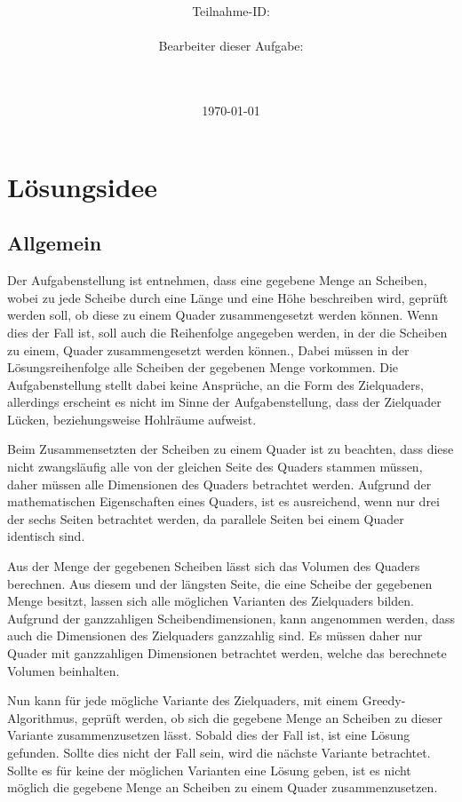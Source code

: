 \documentclass[a4paper,10pt,ngerman]{scrartcl}
\title{\textbf{\Huge\Aufgabe}}
\author{\LARGE Teilnahme-ID: \LARGE \TeilnahmeId \\\\
\LARGE Bearbeiter dieser Aufgabe: \\
\LARGE \Name\\\\}
\date{\LARGE\today}
\begin{document}
    \maketitle
    \tableofcontents
    \vspace{0.5cm}

    \newpage


    \section{Lösungsidee}\label{sec:losungsidee}

    \subsection{Allgemein}\label{subsec:allgemein}

    Der Aufgabenstellung ist entnehmen, dass eine gegebene Menge an Scheiben, wobei zu jede Scheibe durch
    eine Länge und eine Höhe beschreiben wird, geprüft werden soll, ob diese zu einem Quader zusammengesetzt werden können.
    Wenn dies der Fall ist, soll auch die Reihenfolge angegeben werden, in der die Scheiben zu einem, Quader zusammengesetzt werden können.,
    Dabei müssen in der Lösungsreihenfolge alle Scheiben der gegebenen Menge vorkommen.
    Die Aufgabenstellung stellt dabei keine Ansprüche, an die Form des Zielquaders, allerdings erscheint es nicht im Sinne der Aufgabenstellung,
    dass der Zielquader Lücken, beziehungsweise Hohlräume aufweist.

    Beim Zusammensetzten der Scheiben zu einem Quader ist zu beachten, dass diese nicht zwangsläufig alle von der gleichen Seite des Quaders stammen müssen,
    daher müssen alle Dimensionen des Quaders betrachtet werden.
    Aufgrund der mathematischen Eigenschaften eines Quaders, ist es ausreichend, wenn nur drei der sechs Seiten betrachtet werden,
    da parallele Seiten bei einem Quader identisch sind.

    Aus der Menge der gegebenen Scheiben lässt sich das Volumen des Quaders berechnen.
    Aus diesem und der längsten Seite, die eine Scheibe der gegebenen Menge besitzt, lassen sich alle möglichen Varianten des Zielquaders bilden.
    Aufgrund der ganzzahligen Scheibendimensionen, kann angenommen werden, dass auch die Dimensionen des Zielquaders ganzzahlig sind.
    Es müssen daher nur Quader mit ganzzahligen Dimensionen betrachtet werden, welche das berechnete Volumen beinhalten.

    Nun kann für jede mögliche Variante des Zielquaders, mit einem Greedy-Algorithmus, geprüft werden,
    ob sich die gegebene Menge an Scheiben zu dieser Variante zusammenzusetzen lässt.
    Sobald dies der Fall ist, ist eine Lösung gefunden.
    Sollte dies nicht der Fall sein, wird die nächste Variante betrachtet.
    Sollte es für keine der möglichen Varianten eine Lösung geben, ist es nicht möglich die gegebene Menge an Scheiben
    zu einem Quader zusammenzusetzen.
\end{document}
